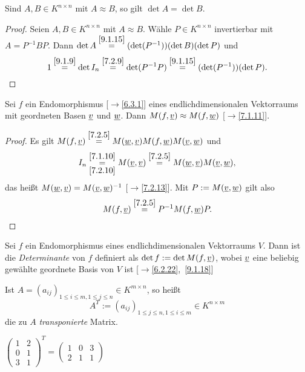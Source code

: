 \documentclass[../../main.tex]{subfiles}
\begin{document}
\begin{sat}\label{9.1.18}
Sind $A,B\in K^{n\times n}$ mit $A\approx B$, so gilt $\det A=\det B$.
\end{sat}

\begin{proof}
Seien $A,B\in K^{n\times n}$ mit $A\approx B$. Wähle $P\in K^{n\times n}$ invertierbar mit $A=P^{-1}BP$. Dann
$\det A\overset{\ref{9.1.15}}=(\det(P^{-1}))(\det B)(\det P)$ und
$$1\overset{\ref{9.1.9}}=\det I_n\overset{\ref{7.2.9}}=\det(P^{-1}P)\overset{\ref{9.1.15}}=(\det(P^{-1}))(\det P).$$
\end{proof}

\begin{pro}\label{9.1.19}
Sei $f$ ein Endomorphismus {\rm[$\to$\ref{6.3.1}]} eines endlichdimensionalen Vektorraums mit geordneten Basen ${\underline v}$ und ${\underline w}$. Dann $M(f,{\underline v})\approx M(f,{\underline w})$ {\rm[$\to$\ref{7.1.11}]}.
\end{pro}

\begin{proof}
Es gilt $M(f,{\underline v})\overset{\ref{7.2.5}}=M({\underline w},{\underline v})M(f,{\underline w})M({\underline v},{\underline w})$ und
\[I_n\underset{\ref{7.2.10}}{\overset{\ref{7.1.10}}=}M({\underline v},{\underline v})\overset{\ref{7.2.5}}=M({\underline w},{\underline v})M({\underline v},{\underline w}),\]
das heißt $M({\underline w},{\underline v})=M({\underline v},{\underline w})^{-1}$ [$\to$\ref{7.2.13}]. Mit $P:=M({\underline v},{\underline w})$ gilt also \[M(f,{\underline v})\overset{\ref{7.2.5}}=P^{-1}M(f,{\underline w})P.\]
\end{proof}

\begin{df}\label{9.1.20}
Sei $f$ ein Endomorphismus eines endlichdimensionalen Vektorraums $V$. Dann ist die \emph{Determinante} von $f$ definiert als
$\det f:=\det M(f,{\underline v})$, wobei ${\underline v}$ eine beliebig gewählte geordnete Basis von $V$ ist [$\to$\ref{6.2.22},~\ref{9.1.18}]
\end{df}

\begin{df}\label{9.1.21}
Ist $A=(a_{ij})_{1\le i\le m,1\le j\le n}\in K^{m\times n}$, so heißt \[A^T:=(a_{ij})_{1\le j\le n,1\le i\le m}\in K^{n\times m}\] die zu $A$ \emph{transponierte} Matrix.
\end{df}

\begin{bsp}\label{9.1.22}
$\begin{pmatrix}1&2\\0&1\\3&1\end{pmatrix}^T=\begin{pmatrix}1&0&3\\2&1&1\end{pmatrix}$
\end{bsp}
\end{document}
